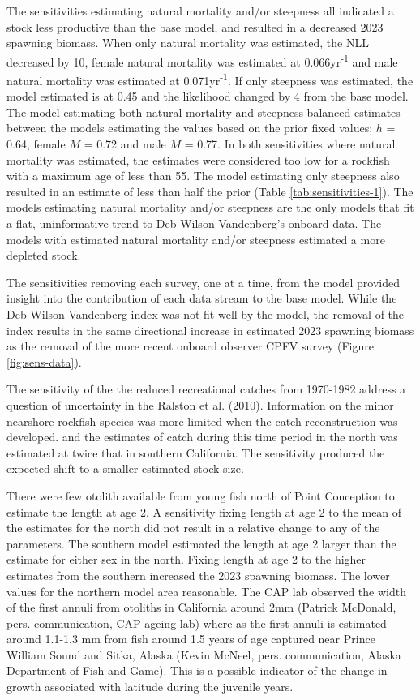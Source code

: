 \documentclass[11pt,
  english,
  letterpaper,
]{article}
\begin{document}
The sensitivities estimating natural mortality and/or steepness all indicated a stock less productive than the base model, and resulted in a decreased 2023 spawning biomass. When only natural mortality was estimated, the NLL decreased by 10, female natural mortality was estimated at 0.066yr\textsuperscript{-1} and male natural mortality was estimated at 0.071yr\textsuperscript{-1}. If only steepness was estimated, the model estimated is at 0.45 and the likelihood changed by 4 from the base model. The model estimating both natural mortality and steepness balanced estimates between the models estimating the values based on the prior fixed values; \(h\) = 0.64, female \(M\) = 0.72 and male \(M\) = 0.77. In both sensitivities where natural mortality was estimated, the estimates were considered too low for a rockfish with a maximum age of less than 55. The model estimating only steepness also resulted in an estimate of less than half the prior (Table \ref{tab:sensitivities-1}). The models estimating natural mortality and/or steepness are the only models that fit a flat, uninformative trend to Deb Wilson-Vandenberg's onboard data. The models with estimated natural mortality and/or steepness estimated a more depleted stock.

The sensitivities removing each survey, one at a time, from the model provided insight into the contribution of each data stream to the base model. While the Deb Wilson-Vandenberg index was not fit well by the model, the removal of the index results in the same directional increase in estimated 2023 spawning biomass as the removal of the more recent onboard observer CPFV survey (Figure \ref{fig:sens-data}).

The sensitivity of the the reduced recreational catches from 1970-1982 address a question of uncertainty in the Ralston et al. (2010). Information on the minor nearshore rockfish species was more limited when the catch reconstruction was developed. and the estimates of catch during this time period in the north was estimated at twice that in southern California. The sensitivity produced the expected shift to a smaller estimated stock size.

There were few otolith available from young fish north of Point Conception to estimate the length at age 2. A sensitivity fixing length at age 2 to the mean of the estimates for the north did not result in a relative change to any of the parameters. The southern model estimated the length at age 2 larger than the estimate for either sex in the north. Fixing length at age 2 to the higher estimates from the southern increased the 2023 spawning biomass. The lower values for the northern model area reasonable. The CAP lab observed the width of the first annuli from otoliths in California around 2mm (Patrick McDonald, pers. communication, CAP ageing lab) where as the first annuli is estimated around 1.1-1.3 mm from fish around 1.5 years of age captured near Prince William Sound and Sitka, Alaska (Kevin McNeel, pers. communication, Alaska Department of Fish and Game). This is a possible indicator of the change in growth associated with latitude during the juvenile years.
\end{document}

